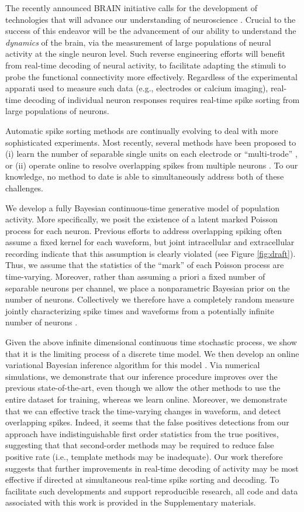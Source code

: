 
The recently announced BRAIN initiative calls for the development of technologies that will advance our understanding of neuroscience \cite{??}.  Crucial to the success of this endeavor will be the advancement of our ability to understand the \emph{dynamics} of the brain, via the measurement of large populations of neural activity at the single neuron level.  Such reverse engineering efforts will benefit from real-time decoding of neural activity, to facilitate adapting the stimuli to probe the functional connectivity more effectively.  Regardless of the experimental apparati used to measure such data (e.g., electrodes or calcium imaging), real-time decoding of individual neuron responses requires real-time spike sorting from large populations of neurons.

Automatic spike sorting methods are continually evolving to deal with more sophisticated experiments.  Most recently, several methods have been proposed to (i) learn the number of separable single units on each electrode or ``multi-trode'' \cite{??}, or (ii) operate online to resolve overlapping spikes from multiple neurons \cite{??}.   To our knowledge, no method to date is able to simultaneously address both of these challenges.  

We develop a fully Bayesian continuous-time generative model of population activity.  More specifically, we posit the existence of a latent marked Poisson process for each neuron.  Previous efforts to address overlapping spiking often assume a fixed kernel for each waveform, but joint intracellular and extracellular recording indicate that this assumption is clearly violated (see Figure \ref{fig:draft}). Thus, we assume that the statistics of the ``mark'' of each Poisson process are time-varying.  Moreover, rather than assuming a priori a fixed number of separable neurons per channel, we place a nonparametric Bayesian prior on the number of neurons.  Collectively we therefore have a completely random measure jointly characterizing spike times and waveforms from a potentially infinite number of neurons \cite{??}.  

Given the above infinite dimensional continuous time stochastic process, we show that it is the limiting process of a discrete time model.  We then develop an online variational Bayesian inference algorithm for this model \cite{??}.  Via numerical simulations, we demonstrate that our inference procedure improves over the previous state-of-the-art, even though we allow the other methods to use the entire dataset for training, whereas we learn online.  Moreover, we demonstrate that we can effective track the time-varying changes in waveform, and detect overlapping spikes.  Indeed, it seems that the false positives detections from our approach have indistinguishable first order statistics from the true positives, suggesting that that second-order methods may be required to reduce false positive rate (i.e., template methods may be inadequate).  Our work therefore suggests that further improvements in real-time decoding of activity may be most effective if directed at simultaneous real-time spike sorting and decoding.  To facilitate such developments and support reproducible research, all code and data associated with this work is provided in the Supplementary materials.